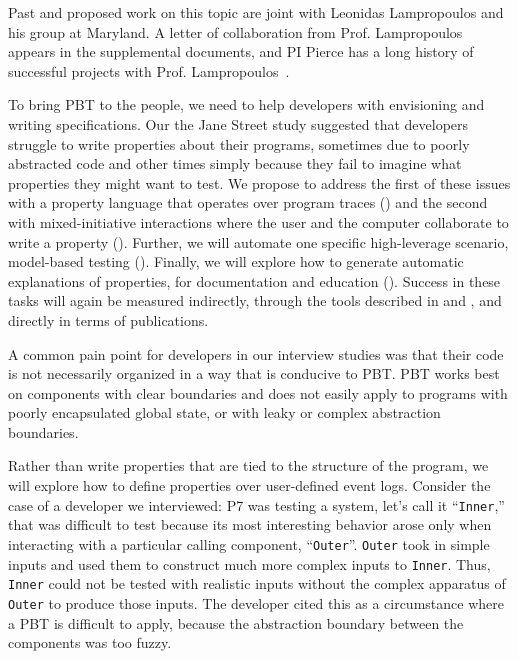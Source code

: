 Past and proposed work on this topic are joint with Leonidas
Lampropoulos and his group at Maryland.
A letter of collaboration
from Prof.{} Lampropoulos appears in the supplemental documents, and
PI Pierce has a long history
of successful projects with Prof.
Lampropoulos~\cite[etc.]{LuckPOPL,goldstein2021dojudgeatest,lampropoulos_coverage_2019,Lampropoulos&18,OLDlampropoulos19fuzzchick}.


%
To bring PBT to the people, we need to help developers with envisioning and writing
specifications.
Our the Jane Street study suggested that developers struggle to write
properties about their programs, sometimes due to poorly abstracted code and
other times simply because they fail to imagine what properties they
might want to
test. We propose to address the first of these issues with a
property language that operates over program traces () and
the second with mixed-initiative interactions where the user and the computer
collaborate to write a property
().
%
Further, we will automate one specific high-leverage scenario,
model-based testing (). Finally, we will explore how to
generate automatic explanations of properties, for documentation and
education ().
%
Success in these tasks will again be measured indirectly, through the
tools described in  and
, and directly in terms of publications.

A common pain point for developers in our interview studies was that
their code is not necessarily organized in a way that is conducive to
PBT.  PBT works best on components with clear boundaries and does not
easily apply to programs with
poorly encapsulated global state, or with leaky or complex abstraction
boundaries.

Rather than write properties that are tied to the structure of the program,
we will explore
how to define properties over user-defined
event logs. Consider
the case of a developer we interviewed: P7 was testing
a system, let's call it ``\lstinline{Inner},'' that  was difficult to
test because
its most interesting behavior arose only when interacting with a particular calling
component, ``\lstinline{Outer}''.
\lstinline{Outer} took in simple inputs and used them to construct
much more complex inputs to \lstinline{Inner}. Thus, \lstinline{Inner}
could not be tested with
realistic inputs without the complex apparatus of \lstinline{Outer} to
produce those inputs.  The developer cited this as a circumstance where a
PBT is difficult to apply, because the abstraction boundary between the
components was too fuzzy.

